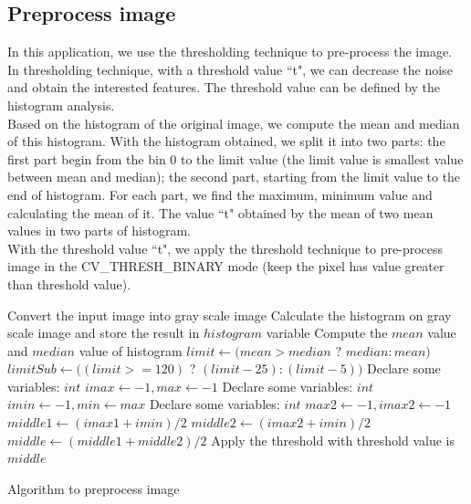 \subsection{Preprocess image}
In this application, we use the thresholding technique to pre-process the image. In thresholding technique, with a threshold value ``t", we can decrease the noise and obtain the interested features. The threshold value can be defined by the histogram analysis.\\[0.2cm]
Based on the histogram of the original image, we compute the mean and median of this histogram. With the histogram obtained, we split it into two parts: the first part begin from the bin 0 to the limit value (the limit value is smallest value between mean and median); the second part, starting from the limit value to the end of histogram. For each part, we find the maximum, minimum value and calculating the mean of it. The value ``t" obtained by the mean of two mean values in two parts of histogram.\\
With the threshold value ``t", we apply the threshold technique to pre-process image in the CV\_THRESH\_BINARY mode (keep the pixel has value greater than threshold value).\\
\IncMargin{1em}
\begin{algorithm}[H]
\Indm 
{}
\Indp
Convert the input image into gray scale image\;
Calculate the histogram on gray scale image and store the result in $histogram$ variable \;
Compute the $mean$ value and $median$ value of histogram\;
$limit \leftarrow (mean > median$ ? $median : mean)$\;
$limitSub \leftarrow ((limit >= 120)$ ? $(limit - 25) : (limit - 5))$\;
Declare some variables: $int$ $imax \leftarrow -1, max \leftarrow -1$\;
Declare some variables: $int$ $imin \leftarrow -1, min \leftarrow max$\;
Declare some variables: $int$ $max2 \leftarrow -1, imax2 \leftarrow -1$\;
$middle1 \leftarrow (imax1 + imin)/2$ \;
$middle2 \leftarrow (imax2 + imin)/2$ \;
$middle \leftarrow (middle1 + middle2)/2$ \;
Apply the threshold with threshold value is $middle$\;
\caption{Algorithm to preprocess image}
\end{algorithm}\DecMargin{1em}
